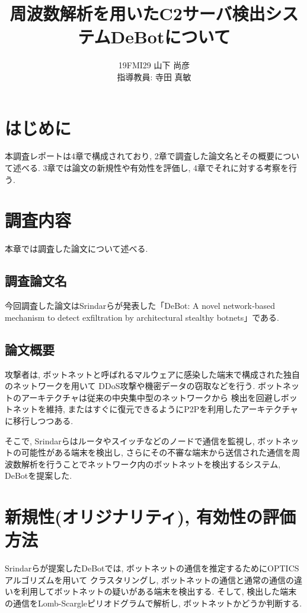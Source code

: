 \documentclass[twocolumn,9]{ltjsarticle}
\title{周波数解析を用いたC2サーバ検出システムDeBotについて}
\author{19FMI29 山下 尚彦 \\ 指導教員: 寺田 真敏}
\date{}
\begin{document}
\maketitle

\section{はじめに}
本調査レポートは4章で構成されており, 2章で調査した論文名とその概要について述べる. 
3章では論文の新規性や有効性を評価し, 4章でそれに対する考察を行う. 

\section{調査内容}
本章では調査した論文について述べる. 

\subsection{調査論文名}
今回調査した論文はSrindarらが発表した「DeBot: A novel network‐based mechanism to detect exfiltration 
by architectural stealthy botnets」\cite{venkatesan2018debot}である. 

\subsection{論文概要}
攻撃者は, ボットネットと呼ばれるマルウェアに感染した端末で構成された独自のネットワークを用いて
DDoS攻撃や機密データの窃取などを行う. ボットネットのアーキテクチャは従来の中央集中型のネットワークから
検出を回避しボットネットを維持, またはすぐに復元できるようにP2Pを利用したアーキテクチャに移行しつつある. 

そこで, Srindarらはルータやスイッチなどのノードで通信を監視し, ボットネットの可能性がある端末を検出し, 
さらにその不審な端末から送信された通信を周波数解析を行うことでネットワーク内のボットネットを検出するシステム, 
DeBotを提案した. 

\section{新規性(オリジナリティ), 有効性の評価方法}
Srindarらが提案したDeBotでは, ボットネットの通信を推定するためにOPTICSアルゴリズム\cite{ankerst1999optics}を用いて
クラスタリングし, ボットネットの通信と通常の通信の違いを利用してボットネットの疑いがある端末を検出する. 
そして, 検出した端末の通信をLomb-Scargleピリオドグラム\cite{vanderplas2018understanding}で解析し, 
ボットネットかどうか判断する. 
\end{document}
